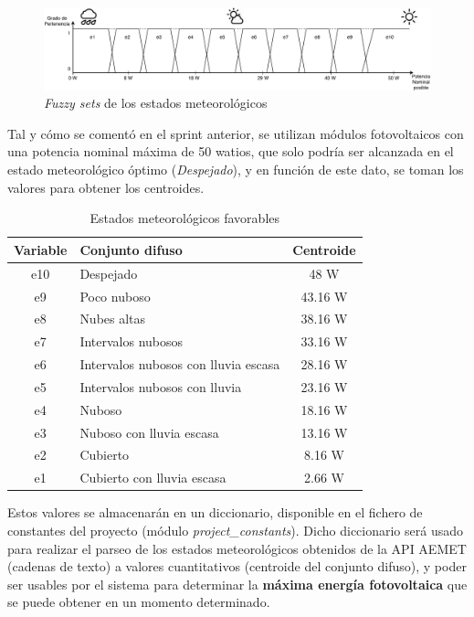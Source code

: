 \begin{figure}[h]
	\centering
	\includegraphics[width=17cm]{figs/Fuzzy_diagram.pdf}
	\caption{\textit{Fuzzy sets} de los estados meteorológicos}
        \label{fig:fuzzySets}
\end{figure}

Tal y cómo se comentó en el sprint anterior, se utilizan módulos fotovoltaicos con una potencia nominal máxima de 50 watios, que solo podría ser alcanzada en el estado meteorológico óptimo (\textit{Despejado}), y en función de este dato, se toman los valores para obtener los centroides.
\begin{table}[hp]
        \centering
        \begin{tabular}{|c|l|c|}
                \hline
                \textbf{Variable} & \textbf{Conjunto difuso} & \textbf{Centroide} \\ \hline
                e10 & Despejado & 48 W \\ \hline
                e9 & Poco nuboso & 43.16 W \\ \hline
                e8 & Nubes altas & 38.16 W \\ \hline
                e7 & Intervalos nubosos & 33.16 W \\ \hline
                e6 & Intervalos nubosos con lluvia escasa & 28.16 W \\ \hline
                e5 & Intervalos nubosos con lluvia & 23.16 W \\ \hline
                e4 & Nuboso & 18.16 W \\ \hline
                e3 & Nuboso con lluvia escasa & 13.16 W \\ \hline
                e2 & Cubierto & 8.16 W \\ \hline
                e1 & Cubierto con lluvia escasa & 2.66 W\\ \hline
        \end{tabular}
        \caption{Estados meteorológicos favorables}
        \label{tab:estadosFavorables}
\end{table}

Estos valores se almacenarán en un diccionario, disponible en el fichero de constantes del proyecto (módulo \textit{project\_constants}). Dicho diccionario será usado para realizar el parseo de los estados meteorológicos obtenidos de la API AEMET (cadenas de texto) a valores cuantitativos (centroide del conjunto difuso), y poder ser usables por el sistema para determinar la \textbf{máxima energía fotovoltaica} que se puede obtener en un momento determinado.
